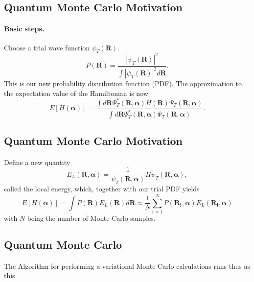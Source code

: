 \documentclass[%
twoside,                 %
final,                   %
10pt]{article}
\begin{document}
\noindent




\subsection*{Quantum Monte Carlo Motivation}

\paragraph{Basic steps.}
Choose a trial wave function
$\psi_T(\bm{R})$.
\[
   P(\bm{R})= \frac{\left|\psi_T(\bm{R})\right|^2}{\int \left|\psi_T(\bm{R})\right|^2d\bm{R}}.
\]
This is our new probability distribution function  (PDF).
The approximation to the expectation value of the Hamiltonian is now 
\[
   E[H(\bm{\alpha})] = 
   \frac{\int d\bm{R}\Psi^{\ast}_T(\bm{R},\bm{\alpha})H(\bm{R})\Psi_T(\bm{R},\bm{\alpha})}
        {\int d\bm{R}\Psi^{\ast}_T(\bm{R},\bm{\alpha})\Psi_T(\bm{R},\bm{\alpha})}.
\]




\subsection*{Quantum Monte Carlo Motivation}

\paragraph{}
Define a new quantity
\[
   E_L(\bm{R},\bm{\alpha})=\frac{1}{\psi_T(\bm{R},\bm{\alpha})}H\psi_T(\bm{R},\bm{\alpha}),
   \label{eq:locale1}
\]
called the local energy, which, together with our trial PDF yields
\[
  E[H(\bm{\alpha})]=\int P(\bm{R})E_L(\bm{R}) d\bm{R}\approx \frac{1}{N}\sum_{i=1}^NP(\bm{R_i},\bm{\alpha})E_L(\bm{R_i},\bm{\alpha})
  \label{eq:vmc1}
\]
with $N$ being the number of Monte Carlo samples.








\subsection*{Quantum Monte Carlo}

\paragraph{}
The Algorithm for performing a variational Monte Carlo calculations runs thus as this
\end{document}
